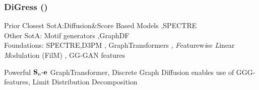 \documentclass[./presentation.tex]{subfiles}
\begin{document}
\begin{frame}[t,label=digressfin]
  \frametitle{DiGress (\cite{vignacDiGressDiscreteDenoising2023b})}
  \vspace{-1cm}
\footnotesize
\begin{priorart}
{\footnotesize
    Prior Closest SotA:Diffusion\&Score Based Models \citep{niuPermutationInvariantGraph2020b,songGenerativeModelingEstimating2019b},SPECTRE \citep{martinkusSPECTRESpectralConditioning2022b}\\
    Other SotA: Motif generators \citep{maziarzLearningExtendMolecular2021},GraphDF\citep{luoGraphDFDiscreteFlow2021d}
\\
Foundations: SPECTRE,D3PM \citep{austinStructuredDenoisingDiffusion2021e}, GraphTransformers \citep{vaswaniAttentionAllYou2017c,yunGraphTransformerNetworks2019b}, \textit{F}eaturew\textit{i}se \textit{L}inear \textit{M}odulation (FilM) \citep{perezFiLMVisualReasoning2018b}, GG-GAN features
 }
  \end{priorart}
  \vspace{-0.25cm}
  \begin{contributions}
    Powerful $\operatorname{\mathbf{S}_n\mathbf{-e}}$ GraphTransformer, Discrete Graph Diffusion enables use of GGG-features, Limit Distribution Decomposition
  \end{contributions}
  \vspace{-0.25cm}
  \begin{columns}
        \footnotesize
    \begin{column}{0.5\textwidth}
    \end{column}
    \begin{column}{0.5\textwidth}
    \end{column}
  \end{columns}
\end{frame}
\end{document}
